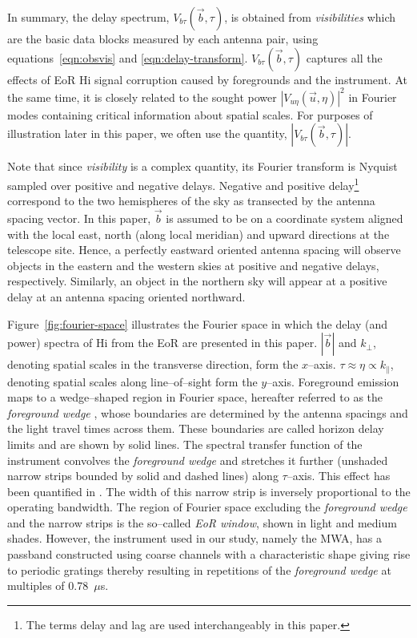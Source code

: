 \documentclass[preprint2,iop,numberedappendix]{emulateapj}
\begin{document}
In summary, the delay spectrum, $V_{b\tau}(\vec{b},\tau)$, is obtained from {\it visibilities} which are the basic data blocks measured by each antenna pair, using equations~\ref{eqn:obsvis} and \ref{eqn:delay-transform}. $V_{b\tau}(\vec{b},\tau)$ captures all the effects of EoR H{\sc i} signal corruption caused by foregrounds and the instrument. At the same time, it is closely related to the sought power $|V_{u\eta}(\vec{u},\eta)|^2$ in Fourier modes containing critical information about spatial scales. For purposes of illustration later in this paper, we often use the quantity, $|V_{b\tau}(\vec{b},\tau)|$.

Note that since {\it visibility} is a complex quantity, its Fourier transform is Nyquist sampled over positive and negative delays. Negative and positive delay\footnote{The terms delay and lag are used interchangeably in this paper.} correspond to the two hemispheres of the sky as transected by the antenna spacing vector. In this paper, $\vec{b}$ is assumed to be on a coordinate system aligned with the local east, north (along local meridian) and upward directions at the telescope site. Hence, a perfectly eastward oriented antenna spacing will observe objects in the eastern and the western skies at positive and negative delays, respectively. Similarly, an object in the northern sky will appear at a positive delay at an antenna spacing oriented northward.

Figure~\ref{fig:fourier-space} illustrates the Fourier space in which the delay (and power) spectra of H{\sc i} from the EoR are presented in this paper. $|\vec{b}|$ and $k_\perp$, denoting spatial scales in the transverse direction, form the $x$--axis. $\tau\approx\eta\propto k_\parallel$, denoting spatial scales along line--of--sight form the $y$--axis. Foreground emission maps to a wedge--shaped region in Fourier space, hereafter referred to as the {\it foreground wedge} \citep{dat10}, whose boundaries are determined by the antenna spacings and the light travel times across them. These boundaries are called horizon delay limits and are shown by solid lines. The spectral transfer function of the instrument convolves the {\it foreground wedge} and stretches it further (unshaded narrow strips bounded by solid and dashed lines) along $\tau$--axis. This effect has been quantified in \citet{thy13}. The width of this narrow strip is inversely proportional to the operating bandwidth. The region of Fourier space excluding the {\it foreground wedge} and the narrow strips is the so--called {\it EoR window}, shown in light and medium shades. However, the instrument used in our study, namely the MWA, has a passband constructed using coarse channels with a characteristic shape giving rise to periodic gratings thereby resulting in repetitions of the {\it foreground wedge} at multiples of 0.78~$\mu$s. 
\end{document}
